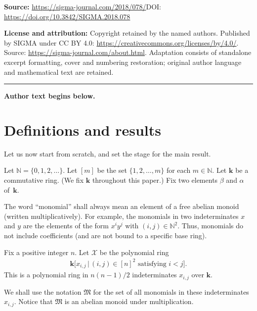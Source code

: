 \documentclass[11pt]{article}
\numberwithin{equation}{section}
\begin{document}
\noindent\textbf{Source:} \url{https://sigma-journal.com/2018/078/}\quad DOI: \url{https://doi.org/10.3842/SIGMA.2018.078}\par
\noindent\textbf{License and attribution:} Copyright retained by the named authors. Published by SIGMA under CC BY 4.0: \url{https://creativecommons.org/licenses/by/4.0/}. Source: \url{https://sigma-journal.com/about.html}. Adaptation consists of standalone excerpt formatting, cover and numbering restoration; original author language and mathematical text are retained.\par
\medskip\hrule\medskip\noindent\textbf{Author text begins below.}\par
\setcounter{section}{1}
\setcounter{subsection}{1}
\setcounter{subsubsection}{0}
\setcounter{Theorem}{1}
\setcounter{equation}{1}
\section{Definitions and results}\label{sect.states}

Let us now start from scratch, and set the stage for the main result.

\begin{Definition}Let $\mathbb{N}=\{ 0,1,2,\ldots\} $. Let $[m] $ be the set $\{ 1,2,\ldots,m\} $ for each $m\in\mathbb{N}$. Let $\mathbf{k}$ be a commutative ring. (We fix $\mathbf{k}$ throughout this paper.) Fix two elements $\beta$ and $\alpha$ of~$\mathbf{k}$.

The word ``monomial'' shall always mean an element of a free abelian monoid (written multiplicatively). For example, the monomials in two indeterminates $x$ and $y$ are the elements of the form $x^{i}y^{j}$ with $(i,j) \in\mathbb{N}^{2}$. Thus, monomials do not include coefficients (and are not bound to a specific base ring).
\end{Definition}

\begin{Definition}Fix a positive integer $n$. Let $\mathcal{X}$ be the polynomial ring
\begin{gather*}
\mathbf{k}\big[ x_{i,j}\,|\, (i,j) \in[n] ^{2}\text{ satisfying }i<j\big] .
\end{gather*}
This is a polynomial ring in $n(n-1) /2$ indeterminates $x_{i,j}$ over $\mathbf{k}$.

We shall use the notation $\mathfrak{M}$ for the set of all monomials in these indeterminates $x_{i,j}$. Notice that $\mathfrak{M}$ is an abelian monoid under multiplication.
\end{Definition}
\end{document}
